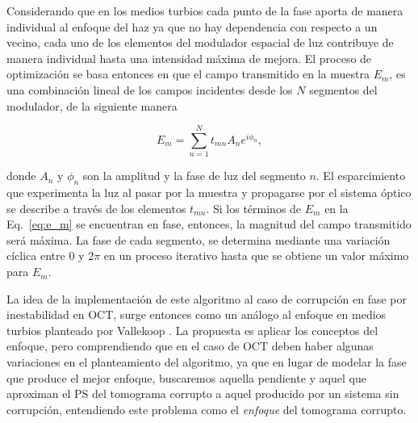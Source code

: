 
Considerando que en los medios turbios cada punto de la fase aporta de manera individual al enfoque del haz ya que no hay dependencia con respecto a un vecino, cada uno de los elementos del modulador espacial de luz contribuye de manera individual hasta una intensidad máxima de mejora. El proceso de optimización se basa entonces en que el campo transmitido en la muestra $E_m$, es una combinación lineal de los campos incidentes desde los $N$ segmentos del modulador, de la siguiente manera

\begin{equation}
\label{eq:e_m}
E_m = \sum_{n=1}^{N} t_{mn}A_ne^{i\phi_n},
\end{equation}

\noindent donde $A_n$ y $\phi_n$ son la amplitud y la fase de luz del segmento $n$. El esparcimiento que experimenta la luz al pasar por la muestra y propagarse por el sistema óptico se describe a través de los elementos $t_{mn}$. Si los términos de $E_m$ en la Eq.~\ref{eq:e_m} se encuentran en fase, entonces, la magnitud del campo transmitido será máxima. La fase de cada segmento, se determina mediante una variación cíclica entre $0$ y $2\pi$ en un proceso iterativo hasta que se obtiene un valor máximo para $E_m$. %

La idea de la implementación de este algoritmo al caso de corrupción en fase por inestabilidad en OCT, surge entonces como un análogo al enfoque en medios turbios planteado por Vallekoop \etal \cite{Vallekoop2007}. La propuesta es aplicar los conceptos del enfoque, pero comprendiendo que en el caso de OCT deben haber algunas variaciones en el planteamiento del algoritmo, ya que en lugar de modelar la fase que produce el mejor enfoque, buscaremos aquella pendiente y aquel \offset que aproximan el PS del tomograma corrupto a aquel producido por un sistema sin corrupción, entendiendo este problema como el \textit{enfoque} del tomograma corrupto.%

